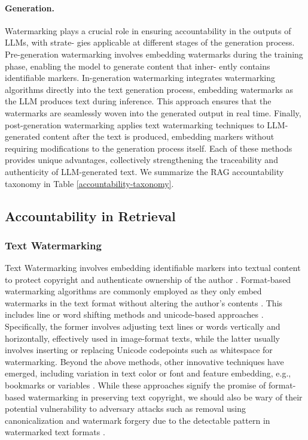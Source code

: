 \paragraph{Generation.}
Watermarking plays a crucial role in ensuring accountability in the outputs of LLMs, with strate-
gies applicable at different stages of the generation process. Pre-generation watermarking involves
embedding watermarks during the training phase, enabling the model to generate content that inher-
ently contains identifiable markers. In-generation watermarking integrates watermarking algorithms
directly into the text generation process, embedding watermarks as the LLM produces text during
inference. This approach ensures that the watermarks are seamlessly woven into the generated output
in real time. Finally, post-generation watermarking applies text watermarking techniques to LLM-
generated content after the text is produced, embedding markers without requiring modifications
to the generation process itself. Each of these methods provides unique advantages, collectively
strengthening the traceability and authenticity of LLM-generated text. We summarize the RAG accountability taxonomy in Table \ref{accountability-taxonomy}.


\subsection{Accountability in Retrieval} 

 \subsubsection{Text Watermarking} \label{8.2.1} Text Watermarking involves embedding identifiable markers into textual content to protect copyright and authenticate ownership of the author \cite{liu2024survey}.  Format-based watermarking algorithms are commonly employed as they only embed watermarks in the text format without altering the author's contents \cite{liu2024survey}. This includes line or word shifting methods  \cite{brassil1995electronic} and unicode-based approaches \cite{por2012unispach,rizzo2016content, sato2023embarrassingly}. Specifically, the former involves adjusting text lines or words vertically and horizontally, effectively used in image-format texts, while the latter usually involves inserting or replacing Unicode codepoints such as whitespace for watermarking. Beyond the above methods, other innovative techniques have emerged, including variation in text color or font \cite{mir2014copyright} and feature embedding, e.g., bookmarks or variables \cite{iqbal2019robust}. While these approaches signify the promise of format-based watermarking in preserving text copyright, we should also be wary of their potential vulnerability to adversary attacks such as removal using canonicalization \cite{boucher2022bad} and watermark forgery due to the detectable pattern in watermarked text formats \cite{liu2024survey}.

